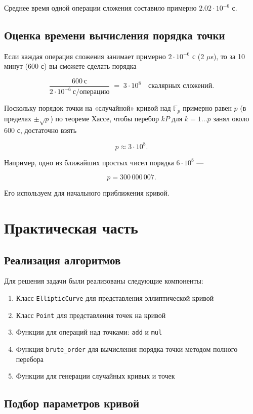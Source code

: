 \documentclass[a4paper,12pt]{article}
\begin{document}
Среднее время одной операции сложения составило примерно $2.02 \cdot 10^{-6}$ с.

\subsection{Оценка времени вычисления порядка точки}
Если каждая операция сложения занимает примерно $2\cdot10^{-6}$ с (2 $\mu$s), то за 10 минут (600 с) вы сможете сделать порядка

$$
\frac{600\ \text{с}}{2\cdot10^{-6}\ \text{с/операцию}}
\;=\;3\cdot10^8
\quad\text{скалярных сложений.}
$$

Поскольку порядок точки на «случайной» кривой над $\mathbb{F}_p$ примерно равен $p$ (в пределах $\pm\sqrt p$) по теореме Хассе, чтобы перебор $kP$ для $k=1\ldots p$ занял около 600 с, достаточно взять

$$
p\approx3\cdot10^8.
$$

Например, одно из ближайших простых чисел порядка $6\cdot10^8$ —

$$
\boxed{p = 300\,000\,007.}
$$

Его используем для начального приближения кривой.

\section{Практическая часть}

\subsection{Реализация алгоритмов}

Для решения задачи были реализованы следующие компоненты:

\begin{enumerate}
    \item Класс \texttt{EllipticCurve} для представления эллиптической кривой
    \item Класс \texttt{Point} для представления точек на кривой
    \item Функции для операций над точками: \texttt{add} и \texttt{mul}
    \item Функция \texttt{brute\_order} для вычисления порядка точки методом полного перебора
    \item Функции для генерации случайных кривых и точек
\end{enumerate}

\subsection{Подбор параметров кривой}
\end{document}
